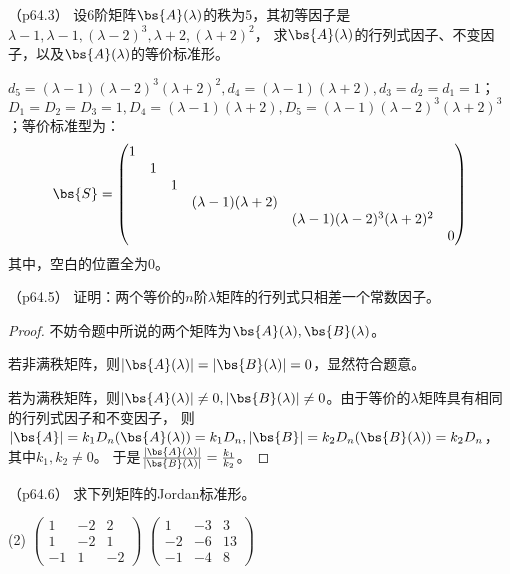 \documentclass[12pt, a4paper, oneside, UTF8]{ctexbook}
\begin{document}
\begin{question}（p64.3）
    设6阶矩阵$\bs{A}(\lambda)$的秩为5，其初等因子是$\lambda-1,\lambda-1,(\lambda-2)^3,\lambda+2,(\lambda+2)^2$，
    求$\bs{A}(\lambda)$的行列式因子、不变因子，以及$\bs{A}(\lambda)$的等价标准形。
\end{question}


\begin{solution}
    $d_5=(\lambda-1)(\lambda-2)^3(\lambda+2)^2,d_4=(\lambda-1)(\lambda+2),d_3=d_2=d_1=1$；
    $D_1=D_2=D_3=1,D_4=(\lambda-1)(\lambda+2),D_5=(\lambda-1)(\lambda-2)^3(\lambda+2)^3$；等价标准型为：
    \begin{align*}
        \bs{S}=\begin{pmatrix}
            1 & & & & & \\
            & 1 & & & &\\
            & & 1 & & &\\
            & & & (\lambda-1)(\lambda+2) & &\\
            & & & & (\lambda-1)(\lambda-2)^3(\lambda+2)^2 &\\
            & & & & & 0 \\
        \end{pmatrix}
    \end{align*}
    其中，空白的位置全为0。
\end{solution}

\begin{question}（p64.5）
    证明：两个等价的$n$阶$\lambda$矩阵的行列式只相差一个常数因子。
\end{question}

\begin{proof}
    不妨令题中所说的两个矩阵为$\bs{A}(\lambda),\bs{B}(\lambda)$。

    若非满秩矩阵，则$|\bs{A}(\lambda)|=|\bs{B}(\lambda)|=0$，显然符合题意。

    若为满秩矩阵，则$|\bs{A}(\lambda)| \neq 0,|\bs{B}(\lambda)| \neq 0$。由于等价的$\lambda$矩阵具有相同的行列式因子和不变因子，
    则$|\bs{A}|=k_1D_n(\bs{A}(\lambda))=k_1D_n,|\bs{B}|=k_2D_n(\bs{B}(\lambda))=k_2D_n$，其中$k_1,k_2 \neq 0$。
    于是$\frac{|\bs{A}(\lambda)|}{|\bs{B}(\lambda)|}=\frac{k_1}{k_2}$。
\end{proof}

\begin{question}（p64.6）
    求下列矩阵的Jordan标准形。
    \begin{tasks}[label=(\arabic*)](2)
        \task $\begin{pmatrix}
            1 & -2 & 2 \\
            1 & -2 & 1\\
            -1 & 1& -2
        \end{pmatrix}$
        \task $\begin{pmatrix}
            1 & -3 & 3 \\
            -2 & -6 & 13\\
            -1 & -4& 8
        \end{pmatrix}$
    \end{tasks}
\end{question}
\end{document}
